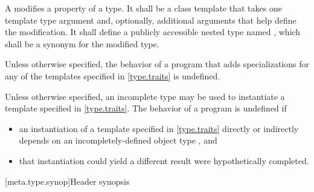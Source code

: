 \pnum
A 
modifies a property
of a type. It shall be a class template that takes one
template type argument and, optionally, additional arguments that help
define the modification. It shall define a publicly accessible nested type
named , which shall be a synonym for the modified type.

\pnum
Unless otherwise specified,
the behavior of a program that adds specializations
for any of the templates specified in \ref{type.traits}
is undefined.

\pnum
Unless otherwise specified, an incomplete type may be used
to instantiate a template specified in \ref{type.traits}.
The behavior of a program is undefined if
\begin{itemize}
\item
  an instantiation of a template specified in \ref{type.traits}
  directly or indirectly depends on
  an incompletely-defined object type , and
\item
  that instantiation could yield a different result
  were  hypothetically completed.
\end{itemize}

[meta.type.synop]{Header  synopsis}

